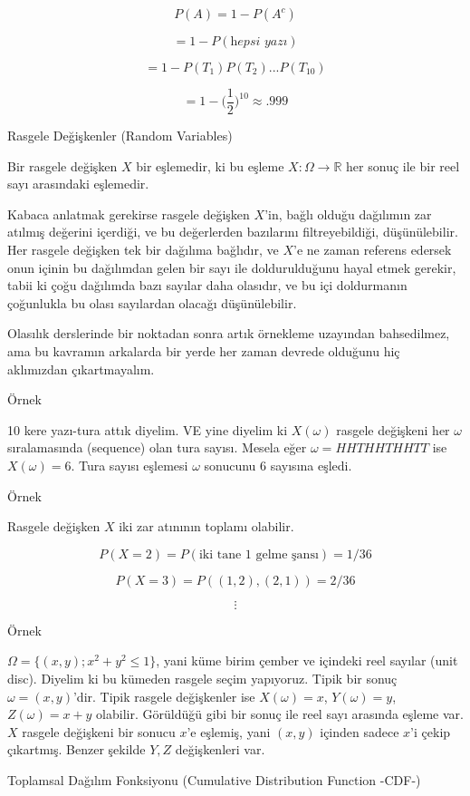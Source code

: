 \documentclass[12pt,fleqn]{article}\usepackage{../../common}
\begin{document}
$$ P(A) = 1 - P(A^c) $$

$$ = 1 - P(\textit{hepsi yazı}) $$

$$ = 1-P(T_1)P(T_2)...P(T_{10}) $$

$$ = 1 - \bigg(\frac{1}{2}\bigg)^{10} \approx .999 $$

Rasgele Değişkenler (Random Variables)

Bir rasgele değişken $X$ bir eşlemedir, ki bu eşleme $X: \Omega \to
\mathbb{R}$ her sonuç ile bir reel sayı arasındaki eşlemedir.

Kabaca anlatmak gerekirse rasgele değişken $X$'in, bağlı olduğu dağılımın
zar atılmış değerini içerdiği, ve bu değerlerden bazılarını
filtreyebildiği, düşünülebilir. Her rasgele değişken tek bir dağılıma
bağlıdır, ve $X$'e ne zaman referens edersek onun içinin bu dağılımdan
gelen bir sayı ile doldurulduğunu hayal etmek gerekir, tabii ki çoğu
dağılımda bazı sayılar daha olasıdır, ve bu içi doldurmanın çoğunlukla bu
olası sayılardan olacağı düşünülebilir.

Olasılık derslerinde bir noktadan sonra artık örnekleme uzayından
bahsedilmez, ama bu kavramın arkalarda bir yerde her zaman devrede olduğunu
hiç aklımızdan çıkartmayalım. 

Örnek

10 kere yazı-tura attık diyelim. VE yine diyelim ki $X(\omega)$ rasgele
değişkeni her $\omega$ sıralamasında (sequence) olan tura sayısı. Mesela
eğer $\omega = HHTHHTHHTT$ ise $X(\omega) = 6$. Tura sayısı eşlemesi
$\omega$ sonucunu 6 sayısına eşledi.

Örnek

Rasgele değişken $X$ iki zar atınının toplamı olabilir. 

$$ P(X=2) = P(\textrm{iki tane 1 gelme şansı}) = 1/36 $$

$$ P(X=3) = P((1,2),(2,1)) = 2/36 $$

$$ \vdots $$

Örnek 

$\Omega = \{ (x,y); x^2+y^2 \le 1 \}$, yani küme birim çember ve içindeki
reel sayılar (unit disc). Diyelim ki bu kümeden rasgele seçim
yapıyoruz. Tipik bir sonuç $\omega = (x,y)$'dir. Tipik rasgele değişkenler
ise $X(\omega) = x$, $Y(\omega) = y$, $Z(\omega) = x+y$ olabilir. Görüldüğü
gibi bir sonuç ile reel sayı arasında eşleme var. $X$ rasgele değişkeni
bir sonucu $x$'e eşlemiş, yani $(x,y)$ içinden sadece $x$'i çekip
çıkartmış. Benzer şekilde $Y,Z$ değişkenleri var. 

Toplamsal Dağılım Fonksiyonu (Cumulative Distribution Function -CDF-)
\end{document}
